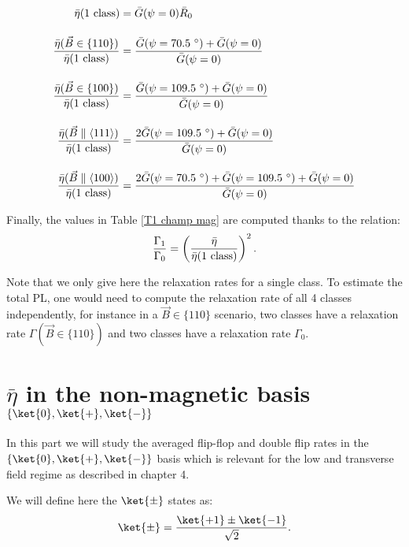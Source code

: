 \documentclass[a4paper, 11pt]{report}
\begin{document}
\begin{align}
\bar \eta(\rm{1\ class})&=\bar G(\psi=0) \bar R_0 \\[1em]
\frac{\bar \eta(\vec{B} \in \{110\})}{\bar \eta(\rm{1\ class})}&= \frac{\bar G(\psi=70.5 \ ^\circ)+ \bar G(\psi=0)}{\bar G(\psi=0)}\\[1em]
\frac{\bar \eta(\vec{B} \in \{100\})}{\bar \eta(\rm{1\ class})}&= \frac{\bar G(\psi=109.5 \ ^\circ)+ \bar G(\psi=0)}{\bar G(\psi=0)}\\[1em]
\frac{\bar \eta(\vec{B} \parallel \langle 111 \rangle)}{\bar \eta(\rm{1\ class})}&= \frac{2\bar G(\psi=109.5 \ ^\circ)+ \bar G(\psi=0)}{\bar G(\psi=0)}\\[1em]
\frac{\bar \eta(\vec{B} \parallel \langle 100 \rangle)}{\bar \eta(\rm{1\ class})}&= \frac{2\bar G(\psi=70.5 \ ^\circ)+ \bar G(\psi=109.5 \ ^\circ) + \bar G(\psi=0)}{\bar G(\psi=0)}
\end{align} 

Finally, the values in Table \ref{T1 champ mag} are computed thanks to the relation: \begin{equation}
\frac{\Gamma_1}{\Gamma_0}= \left(\frac{\bar \eta}{\bar \eta(\rm{1\ class})} \right)^2.
\end{equation}

Note that we only give here the relaxation rates for a single class. To estimate the total PL, one would need to compute the relaxation rate of all 4 classes independently, for instance in a $\vec{B} \in \{110\}$ scenario, two classes have a relaxation rate $\Gamma(\vec{B} \in \{110\})$ and two classes have a relaxation rate $\Gamma_0$.

\section{$\bar \eta$ in the non-magnetic basis $\{ \ket{0}, \ket{+}, \ket{-}\}$}

In this part we will study the averaged flip-flop and double flip rates in the $\{ \ket{0}, \ket{+}, \ket{-}\}$ basis which is relevant for the low and transverse field regime as described in chapter 4.

We will define here the $\ket{\pm}$ states as:
\begin{equation}
\ket{\pm}=\frac{\ket{+1}\pm\ket{-1}}{\sqrt{2}}.
\end{equation}
\end{document}
